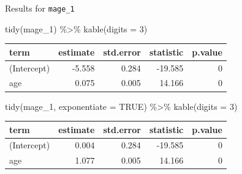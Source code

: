 \documentclass[
  ignorenonframetext,
]{beamer}
\newenvironment{Shaded}{\begin{snugshade}}{\end{snugshade}}
\newcommand{\AttributeTok}[1]{\textcolor[rgb]{0.77,0.63,0.00}{#1}}
\newcommand{\ConstantTok}[1]{\textcolor[rgb]{0.00,0.00,0.00}{#1}}
\newcommand{\DecValTok}[1]{\textcolor[rgb]{0.00,0.00,0.81}{#1}}
\newcommand{\FunctionTok}[1]{\textcolor[rgb]{0.00,0.00,0.00}{#1}}
\newcommand{\NormalTok}[1]{#1}
\newcommand{\SpecialCharTok}[1]{\textcolor[rgb]{0.00,0.00,0.00}{#1}}
\begin{document}
\begin{frame}[fragile]{Results for \texttt{mage\_1}}
\protect\hypertarget{results-for-mage_1}{}
\begin{Shaded}
\begin{Highlighting}[]
\FunctionTok{tidy}\NormalTok{(mage\_1) }\SpecialCharTok{\%\textgreater{}\%} \FunctionTok{kable}\NormalTok{(}\AttributeTok{digits =} \DecValTok{3}\NormalTok{)}
\end{Highlighting}
\end{Shaded}

\begin{longtable}[]{@{}lrrrr@{}}
\toprule
term & estimate & std.error & statistic & p.value \\
\midrule
\endhead
(Intercept) & -5.558 & 0.284 & -19.585 & 0 \\
age & 0.075 & 0.005 & 14.166 & 0 \\
\bottomrule
\end{longtable}

\begin{Shaded}
\begin{Highlighting}[]
\FunctionTok{tidy}\NormalTok{(mage\_1, }\AttributeTok{exponentiate =} \ConstantTok{TRUE}\NormalTok{) }\SpecialCharTok{\%\textgreater{}\%} \FunctionTok{kable}\NormalTok{(}\AttributeTok{digits =} \DecValTok{3}\NormalTok{)}
\end{Highlighting}
\end{Shaded}

\begin{longtable}[]{@{}lrrrr@{}}
\toprule
term & estimate & std.error & statistic & p.value \\
\midrule
\endhead
(Intercept) & 0.004 & 0.284 & -19.585 & 0 \\
age & 1.077 & 0.005 & 14.166 & 0 \\
\bottomrule
\end{longtable}
\end{frame}
\end{document}
